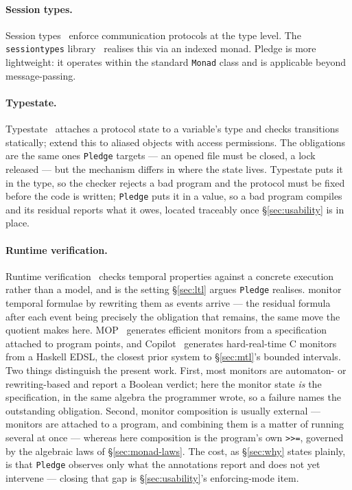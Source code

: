 \documentclass[acmsmall,screen]{acmart}
\begin{document}
\paragraph{Session types.}
Session types~\cite{honda1993,gay2010} enforce communication protocols at the
type level.
The \lstinline{sessiontypes} library~\cite{sessiontypes2017} realises this
via an indexed monad.
Pledge is more lightweight: it operates within the standard \lstinline{Monad}
class and is applicable beyond message-passing.

\paragraph{Typestate.}
Typestate~\cite{strom1986} attaches a protocol state to a variable's type
and checks transitions statically; \citet{bierhoff2007} extend this to
aliased objects with access permissions.
The obligations are the same ones \lstinline{Pledge} targets --- an opened
file must be closed, a lock released --- but the mechanism differs in where
the state lives.
Typestate puts it in the type, so the checker rejects a bad program and the
protocol must be fixed before the code is written;
\lstinline{Pledge} puts it in a value, so a bad program compiles and its
residual reports what it owes, located traceably once \S\ref{sec:usability}
is in place.

\paragraph{Runtime verification.}
Runtime verification~\cite{leucker2009} checks temporal properties against a
concrete execution rather than a model, and is the setting
\S\ref{sec:ltl} argues \lstinline{Pledge} realises.
\citet{havelund2001rewriting} monitor temporal formulae by rewriting them as
events arrive --- the residual formula after each event being precisely the
obligation that remains, the same move the quotient makes here.
MOP~\cite{chen2007mop} generates efficient monitors from a specification
attached to program points, and Copilot~\cite{pike2010copilot} generates
hard-real-time C monitors from a Haskell EDSL, the closest prior system to
\S\ref{sec:mtl}'s bounded intervals.
Two things distinguish the present work.
First, most monitors are automaton- or rewriting-based and report a Boolean
verdict; here the monitor state \emph{is} the specification, in the same
algebra the programmer wrote, so a failure names the outstanding obligation.
Second, monitor composition is usually external --- monitors are attached to
a program, and combining them is a matter of running several at once ---
whereas here composition is the program's own \lstinline{>>=}, governed by
the algebraic laws of \S\ref{sec:monad-laws}.
The cost, as \S\ref{sec:why} states plainly, is that \lstinline{Pledge}
observes only what the annotations report and does not yet intervene ---
closing that gap is \S\ref{sec:usability}'s enforcing-mode item.
\end{document}
